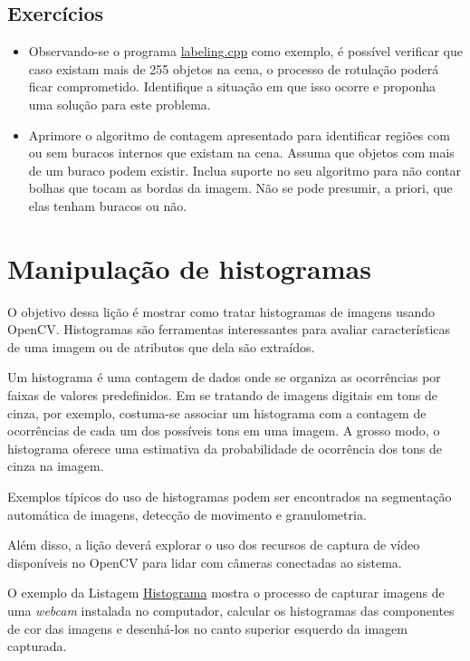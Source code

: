 \documentclass[11pt]{amsbook}
\begin{document}
\hypertarget{x-exercícios}{\section{Exercícios}}
\begin{itemize}

\item Observando-se o programa \href{exemplos/labeling.cpp}{labeling.cpp} como
exemplo, é possível verificar que caso existam mais de 255 objetos
na cena, o processo de rotulação poderá ficar
comprometido. Identifique a situação em que isso ocorre e proponha
uma solução para este problema.

\item Aprimore o algoritmo de contagem apresentado para identificar
regiões com ou sem buracos internos que existam na cena. Assuma que
objetos com mais de um buraco podem existir. Inclua suporte no seu
algoritmo para não contar bolhas que tocam as bordas da imagem. Não
se pode presumir, a priori, que elas tenham buracos ou não.

\end{itemize}


\hypertarget{x-manipulação-de-histogramas}{\chapter{Manipulação de histogramas}}
O objetivo dessa lição é mostrar como tratar histogramas de imagens usando
OpenCV. Histogramas são ferramentas interessantes para avaliar
características de uma imagem ou de atributos que dela são extraídos.


Um histograma é uma contagem de dados onde se organiza as ocorrências
por faixas de valores predefinidos. Em se tratando de imagens digitais
em tons de cinza, por exemplo, costuma-se associar um histograma com a
contagem de ocorrências de cada um dos possíveis tons em uma imagem. A
grosso modo, o histograma oferece uma estimativa da probabilidade de
ocorrência dos tons de cinza na imagem.


Exemplos típicos do uso de histogramas podem ser encontrados na
segmentação automática de imagens, detecção de movimento e
granulometria.


Além disso, a lição deverá explorar o uso dos recursos de captura de
vídeo disponíveis no OpenCV para lidar com câmeras conectadas ao
sistema.


O exemplo da Listagem \hyperlink{exa-histogram}{Histograma} mostra o processo de capturar
imagens de uma \emph{webcam} instalada no computador, calcular os
histogramas das componentes de cor das imagens e desenhá-los no canto
superior esquerdo da imagem capturada.
\end{document}
